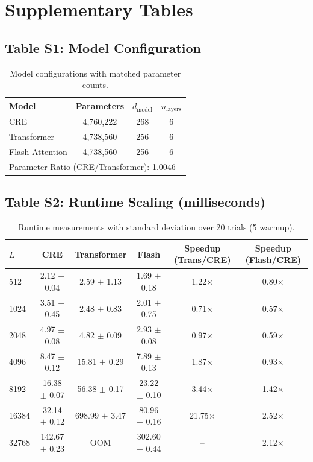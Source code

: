 
\section*{Supplementary Tables}

\subsection*{Table S1: Model Configuration}
\begin{table}[h]
\centering
\begin{tabular}{lccc}
\toprule
Model & Parameters & $d_{\text{model}}$ & $n_{\text{layers}}$ \\
\midrule
CRE & 4,760,222 & 268 & 6 \\
Transformer & 4,738,560 & 256 & 6 \\
Flash Attention & 4,738,560 & 256 & 6 \\
\midrule
\multicolumn{4}{l}{Parameter Ratio (CRE/Transformer): 1.0046} \\
\bottomrule
\end{tabular}
\caption{Model configurations with matched parameter counts.}
\end{table}

\subsection*{Table S2: Runtime Scaling (milliseconds)}
\begin{table}[h]
\centering
\small
\begin{tabular}{lccccc}
\toprule
$L$ & CRE & Transformer & Flash & Speedup (Trans/CRE) & Speedup (Flash/CRE) \\
\midrule
512 & 2.12 $\pm$ 0.04 & 2.59 $\pm$ 1.13 & 1.69 $\pm$ 0.18 & 1.22$\times$ & 0.80$\times$ \\
1024 & 3.51 $\pm$ 0.45 & 2.48 $\pm$ 0.83 & 2.01 $\pm$ 0.75 & 0.71$\times$ & 0.57$\times$ \\
2048 & 4.97 $\pm$ 0.08 & 4.82 $\pm$ 0.09 & 2.93 $\pm$ 0.08 & 0.97$\times$ & 0.59$\times$ \\
4096 & 8.47 $\pm$ 0.12 & 15.81 $\pm$ 0.29 & 7.89 $\pm$ 0.13 & 1.87$\times$ & 0.93$\times$ \\
8192 & 16.38 $\pm$ 0.07 & 56.38 $\pm$ 0.17 & 23.22 $\pm$ 0.10 & 3.44$\times$ & 1.42$\times$ \\
16384 & 32.14 $\pm$ 0.12 & 698.99 $\pm$ 3.47 & 80.96 $\pm$ 0.16 & 21.75$\times$ & 2.52$\times$ \\
32768 & 142.67 $\pm$ 0.23 & OOM & 302.60 $\pm$ 0.44 & -- & 2.12$\times$ \\
\bottomrule
\end{tabular}
\caption{Runtime measurements with standard deviation over 20 trials (5 warmup).}
\end{table}

